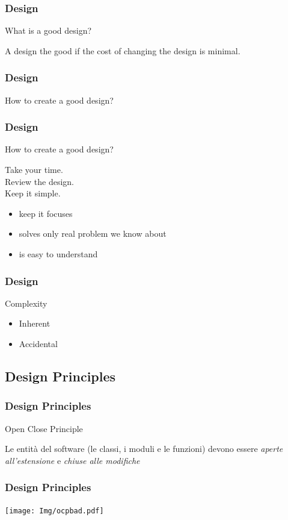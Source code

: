\documentclass{beamer}
\begin{document}
\begin{frame}
\frametitle{Design}
What is a good design?
\begin{framed}
A design the good if the cost of changing the design is minimal.
\end{framed}
\end{frame}


\begin{frame}
\frametitle{Design}
How to create a good design?
\end{frame}

\begin{frame}
\frametitle{Design}
How to create a good design?
\begin{framed}
Take your time.\\
Review the design.\\
Keep it simple.\\
\begin{itemize}
\item keep it focuses
\item solves only real problem we know about
\item is easy to understand
\end{itemize}
\end{framed}
\end{frame}

\begin{frame}
\frametitle{Design}
Complexity
\begin{framed}
\begin{itemize}
\item Inherent
\item Accidental
\end{itemize}
\end{framed}
\end{frame}

\subsection{Design Principles}

\begin{frame}
\frametitle{Design Principles}
Open Close Principle
\begin{framed}
Le entit\`a del software (le classi, i moduli e le funzioni) devono essere \emph{aperte all'estensione} e \emph{chiuse alle modifiche}\\
\end{framed}
\end{frame}

\begin{frame}
\frametitle{Design Principles}
\texttt{[image: Img/ocpbad.pdf]}
\end{frame}
\end{document}
